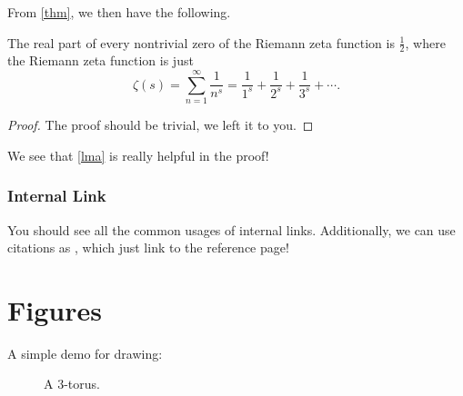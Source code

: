 \begin{corollary}\label{col}
	From \autoref{thm}, we then have the following.

	\par The real part of every nontrivial zero of the Riemann zeta function is \(\frac{1}{2}\), where the
	Riemann zeta function is just
	\[
		\zeta (s)=\sum _{n=1}^{\infty }{\frac {1}{n^{s}}}={\frac {1}{1^{s}}}+{\frac {1}{2^{s}}}+{\frac {1}{3^{s}}}+\cdots.
	\]
\end{corollary}
\begin{proof}
	The proof should be trivial, we left it to you.
\end{proof}
\begin{prev}
	We see that \autoref{lma} is really helpful in the proof!
\end{prev}

\subsubsection{Internal Link}
You should see all the common usages of internal links. Additionally, we can use citations as \cite{newton1726philosophiae}, which just link
to the reference page!

\section{Figures}
A simple demo for drawing:
\begin{figure}[H]
	\centering
	\caption[Caption]{A \(3\)-torus.\footnotemark}
	\label{fig:test}
\end{figure}

